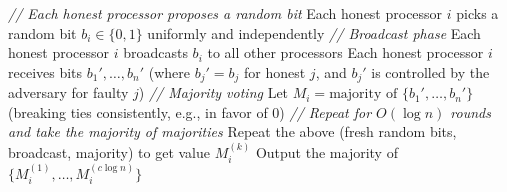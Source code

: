 \documentclass[twoside,12pt]{book}
\theoremstyle{plain}
\theoremstyle{definition}
\theoremstyle{remark}
\begin{document}
\begin{algorithm}[H]
\caption{Randomized Byzantine Agreement (Constant-Round)}
\label{alg:random-byzantine}
\begin{algorithmic}[1]
\State \textit{// Each honest processor proposes a random bit}
\State Each honest processor $i$ picks a random bit $b_i \in \{0, 1\}$ uniformly and independently
\State \textit{// Broadcast phase}
\State Each honest processor $i$ broadcasts $b_i$ to all other processors
\State Each honest processor $i$ receives bits $b_1', \ldots, b_n'$ (where $b_j' = b_j$ for honest $j$, and $b_j'$ is controlled by the adversary for faulty $j$)
\State \textit{// Majority voting}
\State Let $M_i = \text{majority of } \{b_1', \ldots, b_n'\}$ (breaking ties consistently, e.g., in favor of 0)
\State \textit{// Repeat for $O(\log n)$ rounds and take the majority of majorities}
\State Repeat the above (fresh random bits, broadcast, majority) to get value $M_i^{(k)}$
\EndFor
\State Output the majority of $\{M_i^{(1)}, \ldots, M_i^{(c \log n)}\}$
\EndProcedure
\end{algorithmic}
\end{algorithm}
\end{document}
